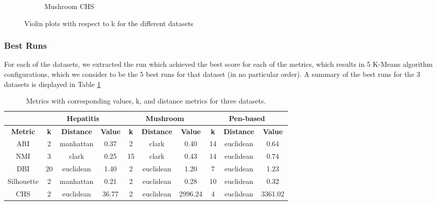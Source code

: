 \begin{figure}[H]
\begin{subfigure}{0.32\textwidth}
        \caption{Mushroom CHS}
    \end{subfigure}
    \caption{Violin plots with respect to k for the different datasets}
    \label{fig:kmeans:violin}
\end{figure}

\subsubsection{Best Runs}
For each of the datasets, we extracted the run which achieved the best score for each of the metrics, which results in 5 K-Means algorithm configurations, which we consider to be the 5 best runs for that dataset (in no particular order). A summary of the best runs for the 3 datasets is displayed in Table \ref{tab:kmeans:best_runs}
\begin{table}[h!]
    \centering
    \begin{tabular}{|c|ccc|ccc|ccc|}
        \hline
                        & \multicolumn{3}{c|}{\textbf{Hepatitis}} & \multicolumn{3}{c|}{\textbf{Mushroom}} & \multicolumn{3}{c|}{\textbf{Pen-based}} \\ \hline
        \textbf{Metric} & \textbf{k} & \textbf{Distance} & \textbf{Value} 
                        & \textbf{k} & \textbf{Distance} & \textbf{Value} 
                        & \textbf{k} & \textbf{Distance} & \textbf{Value} \\ \hline
        ARI            & 2          & manhattan         & 0.37 
                       & 2          & clark         & 0.40 
                       & 14          & euclidean             & 0.64 \\ \hline
        NMI            & 3          & clark             & 0.25 
                       & 15          & clark         & 0.43 
                       & 14          & euclidean         & 0.74 \\ \hline
        DBI            & 20         & euclidean         & 1.40 
                       & 2         & euclidean             & 1.20 
                       & 7         & euclidean         & 1.23 \\ \hline
        Silhouette     & 2          & manhattan         & 0.21 
                       & 2          & euclidean         & 0.28 
                       & 10          & euclidean             & 0.32 \\ \hline
        CHS            & 2          & euclidean         & 36.77 
                       & 2          & euclidean         & 2996.24 
                       & 4          & euclidean         & 3361.02 \\ \hline
    \end{tabular}
    \caption{Metrics with corresponding values, k, and distance metrics for three datasets.}
    \label{tab:kmeans:best_runs}
\end{table}

